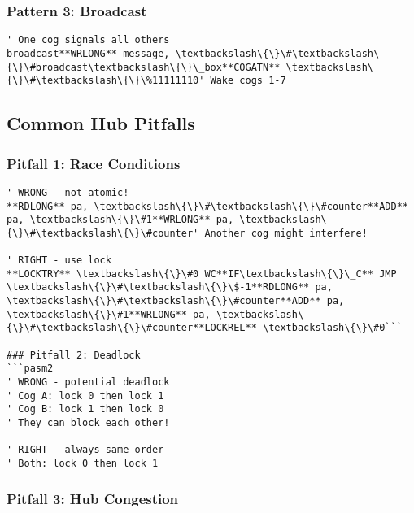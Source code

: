 \documentclass[11pt]{book}
\begin{document}
\hypertarget{pattern-3-broadcast}{%
\subsubsection{Pattern 3: Broadcast}\label{pattern-3-broadcast}}

\begin{lstlisting}
' One cog signals all others
broadcast**WRLONG** message, \textbackslash\{\}\#\textbackslash\{\}\#broadcast\textbackslash\{\}\_box**COGATN** \textbackslash\{\}\#\textbackslash\{\}\%11111110' Wake cogs 1-7
\end{lstlisting}

\hypertarget{common-hub-pitfalls}{%
\subsection{Common Hub Pitfalls}\label{common-hub-pitfalls}}

\hypertarget{pitfall-1-race-conditions}{%
\subsubsection{Pitfall 1: Race
Conditions}\label{pitfall-1-race-conditions}}

\begin{lstlisting}
' WRONG - not atomic!
**RDLONG** pa, \textbackslash\{\}\#\textbackslash\{\}\#counter**ADD** pa, \textbackslash\{\}\#1**WRLONG** pa, \textbackslash\{\}\#\textbackslash\{\}\#counter' Another cog might interfere!
        
' RIGHT - use lock
**LOCKTRY** \textbackslash\{\}\#0 WC**IF\textbackslash\{\}\_C** JMP \textbackslash\{\}\#\textbackslash\{\}\$-1**RDLONG** pa, \textbackslash\{\}\#\textbackslash\{\}\#counter**ADD** pa, \textbackslash\{\}\#1**WRLONG** pa, \textbackslash\{\}\#\textbackslash\{\}\#counter**LOCKREL** \textbackslash\{\}\#0```

### Pitfall 2: Deadlock
```pasm2
' WRONG - potential deadlock
' Cog A: lock 0 then lock 1
' Cog B: lock 1 then lock 0
' They can block each other!

' RIGHT - always same order
' Both: lock 0 then lock 1
\end{lstlisting}

\hypertarget{pitfall-3-hub-congestion}{%
\subsubsection{Pitfall 3: Hub
Congestion}\label{pitfall-3-hub-congestion}}
\end{document}
